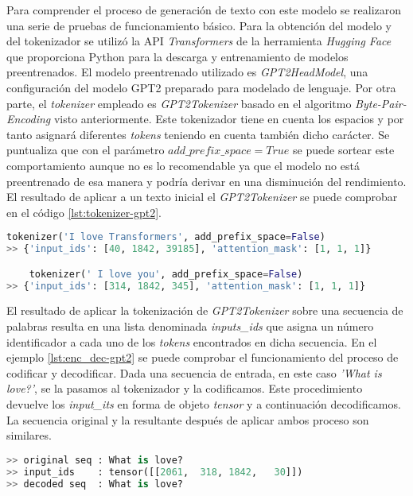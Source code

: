 Para comprender el proceso de generación de texto con este modelo se realizaron una serie de pruebas de funcionamiento básico. Para la obtención del modelo y del tokenizador se utilizó la API \textit{Transformers} de la herramienta \textit{Hugging Face} que proporciona Python para la descarga y entrenamiento de modelos preentrenados. El modelo preentrenado utilizado es \textit{GPT2HeadModel}, una configuración del modelo GPT2 preparado para modelado de lenguaje. Por otra parte, el \textit{tokenizer} empleado es \textit{GPT2Tokenizer} basado en el algoritmo \textit{Byte-Pair-Encoding} visto anteriormente. Este tokenizador tiene en cuenta los espacios y por tanto asignará diferentes \textit{tokens} teniendo en cuenta también dicho carácter. Se puntualiza que con el parámetro $add\_prefix\_space=True$ 
se puede sortear este comportamiento aunque no es lo recomendable ya que el modelo no está preentrenado de esa manera y podría derivar en una disminución del rendimiento. El resultado de aplicar a un texto inicial el \textit{GPT2Tokenizer} se puede comprobar en el código \ref{lst:tokenizer-gpt2}.
 
\begin{lstlisting}[language=Python, caption=Ejemplo de uso de \textit{GPT2Tokenizer}, label={lst:tokenizer-gpt2}]
	tokenizer('I love Transformers', add_prefix_space=False)
>> {'input_ids': [40, 1842, 39185], 'attention_mask': [1, 1, 1]}

	tokenizer(' I love you', add_prefix_space=False)
>> {'input_ids': [314, 1842, 345], 'attention_mask': [1, 1, 1]}
\end{lstlisting} 

El resultado de aplicar la tokenización de \textit{GPT2Tokenizer} sobre una secuencia de palabras resulta en una lista denominada \textit{inputs\_ids} que asigna un número identificador a cada uno de los \textit{tokens} encontrados en dicha secuencia. En el ejemplo \ref{lst:enc_dec-gpt2} se puede comprobar el funcionamiento del proceso de codificar y decodificar. Dada una secuencia de entrada, en este caso \textit{'What is love?'}, se la pasamos al tokenizador y la codificamos. Este procedimiento devuelve los \textit{input\_its} en forma de objeto \textit{tensor} y a continuación decodificamos. La secuencia original y la resultante después de aplicar ambos proceso son similares.

\begin{lstlisting}[language=Python, caption= Encode y Decode, label={lst:enc_dec-gpt2}]
>> original seq : What is love?
>> input_ids    : tensor([[2061,  318, 1842,   30]])
>> decoded seq  : What is love?


\end{lstlisting} 

